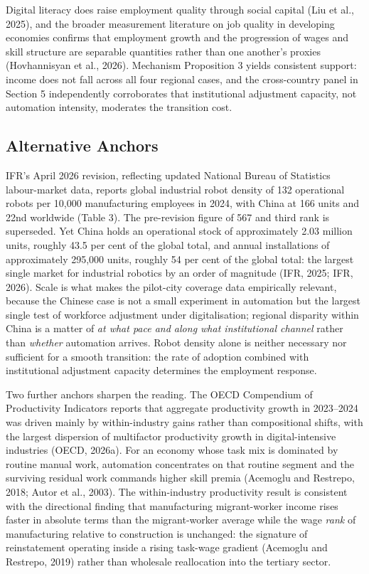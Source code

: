 \documentclass[12pt]{article}
\begin{document}
Digital literacy does raise employment quality through social capital (Liu et al., 2025), and the broader measurement literature on job quality in developing economies confirms that employment growth and the progression of wages and skill structure are separable quantities rather than one another's proxies (Hovhannisyan et al., 2026). Mechanism Proposition 3 yields consistent support: income does not fall across all four regional cases, and the cross-country panel in Section 5 independently corroborates that institutional adjustment capacity, not automation intensity, moderates the transition cost.

\subsection{Alternative Anchors}

IFR's April 2026 revision, reflecting updated National Bureau of Statistics labour-market data, reports global industrial robot density of 132 operational robots per 10,000 manufacturing employees in 2024, with China at 166 units and 22nd worldwide (Table 3). The pre-revision figure of 567 and third rank is superseded. Yet China holds an operational stock of approximately 2.03 million units, roughly 43.5 per cent of the global total, and annual installations of approximately 295,000 units, roughly 54 per cent of the global total: the largest single market for industrial robotics by an order of magnitude (IFR, 2025; IFR, 2026). Scale is what makes the pilot-city coverage data empirically relevant, because the Chinese case is not a small experiment in automation but the largest single test of workforce adjustment under digitalisation; regional disparity within China is a matter of \emph{at what pace and along what institutional channel} rather than \emph{whether} automation arrives. Robot density alone is neither necessary nor sufficient for a smooth transition: the rate of adoption combined with institutional adjustment capacity determines the employment response.



Two further anchors sharpen the reading. The OECD Compendium of Productivity Indicators reports that aggregate productivity growth in 2023--2024 was driven mainly by within-industry gains rather than compositional shifts, with the largest dispersion of multifactor productivity growth in digital-intensive industries (OECD, 2026a). For an economy whose task mix is dominated by routine manual work, automation concentrates on that routine segment and the surviving residual work commands higher skill premia (Acemoglu and Restrepo, 2018; Autor et al., 2003). The within-industry productivity result is consistent with the directional finding that manufacturing migrant-worker income rises faster in absolute terms than the migrant-worker average while the wage \emph{rank} of manufacturing relative to construction is unchanged: the signature of reinstatement operating inside a rising task-wage gradient (Acemoglu and Restrepo, 2019) rather than wholesale reallocation into the tertiary sector.
\end{document}
